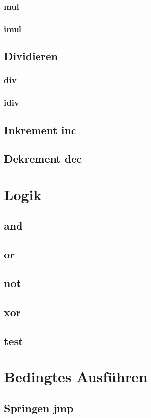 \documentclass[12pt, a4paper, utf8]{book}
\begin{document}
\subsection{mul}
\subsection{imul}
\section{Dividieren}
\subsection{div}
\subsection{idiv}
\section{Inkrement inc}
\section{Dekrement dec}
\chapter{Logik}
\section{and}
\section{or}
\section{not}
\section{xor}
\section{test}
\chapter{Bedingtes Ausführen}
\section{Springen jmp}
\end{document}
